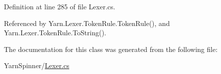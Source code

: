Definition at line 285 of file Lexer.\-cs.



Referenced by Yarn.\-Lexer.\-Token\-Rule.\-Token\-Rule(), and Yarn.\-Lexer.\-Token\-Rule.\-To\-String().



The documentation for this class was generated from the following file\-:\begin{DoxyCompactItemize}
\item 
Yarn\-Spinner/\hyperlink{a00313}{Lexer.\-cs}\end{DoxyCompactItemize}
